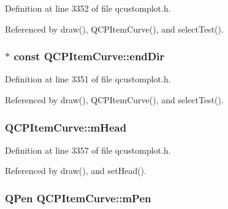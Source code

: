Definition at line 3352 of file qcustomplot.\+h.



Referenced by draw(), Q\+C\+P\+Item\+Curve(), and select\+Test().

\hypertarget{class_q_c_p_item_curve_a28181a9dee9cc3c3da83a883221bd2d0}{}
\subsubsection[{end\+Dir}]{$\ast$ const Q\+C\+P\+Item\+Curve\+::end\+Dir}\label{class_q_c_p_item_curve_a28181a9dee9cc3c3da83a883221bd2d0}


Definition at line 3351 of file qcustomplot.\+h.



Referenced by draw(), Q\+C\+P\+Item\+Curve(), and select\+Test().

\hypertarget{class_q_c_p_item_curve_af2cc26ff199570940dc96f5ec19a13f8}{}
\subsubsection[{m\+Head}]{ Q\+C\+P\+Item\+Curve\+::m\+Head\hspace{0.3cm}{\ttfamily [protected]}}\label{class_q_c_p_item_curve_af2cc26ff199570940dc96f5ec19a13f8}


Definition at line 3357 of file qcustomplot.\+h.



Referenced by draw(), and set\+Head().

\hypertarget{class_q_c_p_item_curve_a7ef92988d1db2e4d0311e34c0a57fe42}{}
\subsubsection[{m\+Pen}]{\setlength{\rightskip}{0pt plus 5cm}Q\+Pen Q\+C\+P\+Item\+Curve\+::m\+Pen\hspace{0.3cm}{\ttfamily [protected]}}\label{class_q_c_p_item_curve_a7ef92988d1db2e4d0311e34c0a57fe42}


